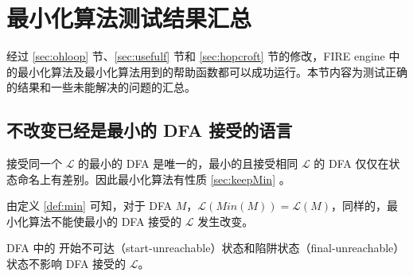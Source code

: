 \section{最小化算法测试结果汇总}\label{sec:listall}

经过 \ref{sec:ohloop} 节、\ref{sec:usefulf} 节和 \ref{sec:hopcroft} 节的修改，FIRE engine 中的最小化算法及最小化算法用到的帮助函数都可以成功运行。本节内容为测试正确的结果和一些未能解决的问题的汇总。

\subsection{不改变已经是最小的 DFA 接受的语言}

接受同一个 $\mathcal{L}$ 的最小的 DFA 是唯一的，最小的且接受相同 $\mathcal{L}$ 的 DFA 仅仅在状态命名上有差别\cite{book1}。因此最小化算法有性质 \ref{sec:keepMin} 。

\begin{property}\label{sec:keepMin}
    由定义 \ref{def:min} 可知，对于 DFA $M$，$\mathcal{L}(Min(M))= \mathcal{L}(M)$，同样的，最小化算法不能使最小的 DFA 接受的 $\mathcal{L}$ 发生改变。
\end{property}

\begin{remark}
    DFA 中的 开始不可达（start-unreachable）状态和陷阱状态（final-unreachable）状态不影响 DFA 接受的 $\mathcal{L}$。
\end{remark}




